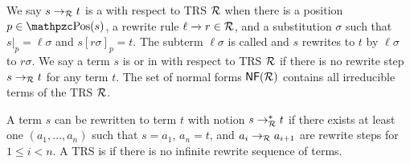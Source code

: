 %
\begin{definition}
	We say \( s\rightarrow_{\mathcal{R}} t \) is a
	 with respect to TRS \( \mathcal{R} \)
	when there is a position \( p \in \pos(s) \),
	a rewrite rule \( \ell\xrightarrow[{}]{} r\in\mathcal{R} \),
	and a substitution \( \sigma \) such that
	\( s|_p=\ell\sigma \) and \( s{[r\sigma]}_p = t \).
		The subterm \( \ell\sigma \) is called  and
	\( s \) rewrites to \( t \) by  \( \ell\sigma \) to  \( r\sigma \).
	We say a term \( s \) is  or in  with respect to TRS \( \mathcal{R} \) if there is no rewrite step \( s\rightarrow_{\mathcal{R}} t \) for any term \( t \).
	The set of normal forms \( \mathsf{NF} (\mathcal{R}) \) contains all irreducible terms of the TRS \( \mathcal{R} \).

	\end{definition}
%
%
\begin{definition}
	A term \( s \) can be rewritten to term \( t \) with notion \( s\rightarrow^*_{\mathcal{R}} t \)
	if there exists at least one  \( (a_1,\ldots ,a_n) \) such that
	\( s=a_1 \), \( a_n=t \), and \( a_i\rightarrow_{\mathcal{R}} a_{i+1} \) are rewrite steps for \( 1\leq i<n \).
	A TRS is  if there is no infinite rewrite sequence of terms.
\end{definition}
